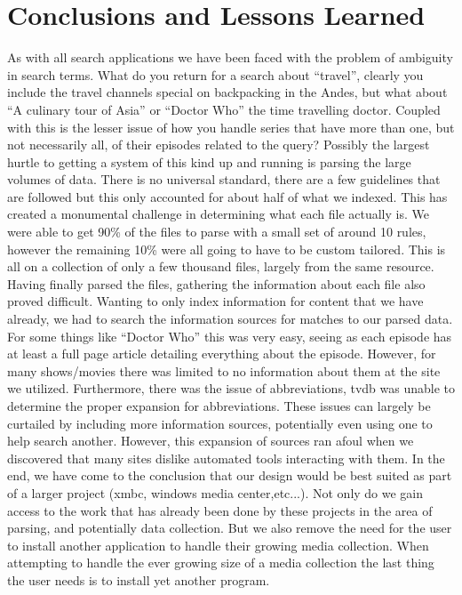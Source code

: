 \documentclass{acm_proc_article-sp}
\begin{document}
\section{Conclusions and Lessons Learned}
    As with all search applications we have been faced with the problem of ambiguity in search terms. What do you return for a search about “travel”, clearly you include the travel channels special on backpacking in the Andes, but what about “A culinary tour of Asia” or “Doctor Who” the time travelling doctor. Coupled with this is the lesser issue of how you handle series that have more than one, but not necessarily all, of their episodes related to the query?
    Possibly the largest hurtle to getting a system of this kind up and running is parsing the large volumes of data. There is no universal standard, there are a few guidelines that are followed but this only accounted for about half of what we indexed. This has created a monumental challenge in determining what each file actually is. We were able to get 90\% of the files to parse with a small set of around 10 rules, however the remaining 10\% were all going to have to be custom tailored. This is all on a collection of only a few thousand files, largely from the same resource.
    Having finally parsed the files, gathering the information about each file also proved difficult. Wanting to only index information for content that we have already, we had to search the information sources for matches to our parsed data. For some things like “Doctor Who” this was very easy, seeing as each episode has at least a full page article detailing everything about the episode. However, for many shows/movies there was limited to no information about them at the site we utilized. Furthermore, there was the issue of abbreviations, tvdb was unable to determine the proper expansion for abbreviations. These issues can largely be curtailed by including more information sources, potentially even using one to help search another. However, this expansion of sources ran afoul when we discovered that many sites dislike automated tools interacting with them.
    In the end, we have come to the conclusion that our design would be best suited as part of a larger project (xmbc, windows media center,etc...). Not only do we gain access to the work that has already been done by these projects in the area of parsing, and potentially data collection. But we also remove the need for the user to install another application to handle their growing media collection. When attempting to handle the ever growing size of a media collection  the last thing the user needs is to install yet another program. 


\end{document}
